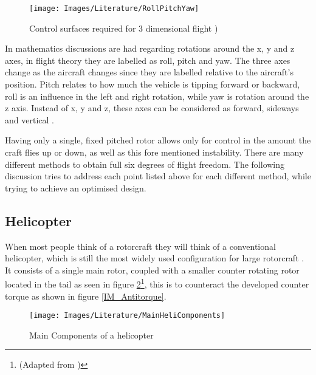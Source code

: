 \begin{figure}[H]
	\centering
	\texttt{[image: Images/Literature/RollPitchYaw]}     
	\caption{Control surfaces required for 3 dimensional flight \cite{Heli})}
	\label{IM_PRY}
\end{figure}

In mathematics discussions are had regarding rotations around the x, y and z axes, in flight theory they are labelled as roll, pitch and yaw. The three axes change as the aircraft changes since they are labelled relative to the aircraft's position. Pitch relates to how much the vehicle is tipping forward or backward, roll is an influence in the left and right rotation, while yaw is rotation around the z axis. Instead of  x, y and z, these axes can be considered as forward, sideways and vertical \cite{Leishman}.

Having only a single, fixed pitched rotor allows only for control in the amount the craft flies up or down, as well as this fore mentioned instability. There are many different methods to obtain full six degrees of flight freedom. The following discussion tries to address each point listed above for each different method, while trying to achieve an optimised design.


	\subsection{Helicopter}
	When most people think of a rotorcraft they will think of a conventional helicopter, which is still the most widely used configuration for large rotorcraft \cite{RotorConfig}. It consists of a single main rotor, coupled with a smaller counter rotating rotor located in the tail as seen in figure \ref{IM_Helicopter}\footnote{(Adapted from \cite{Heli})}, this is to counteract the developed counter torque as shown in figure \ref{IM_Antitorque}.
	
	\begin{figure}[H]
	\centering
	\texttt{[image: Images/Literature/MainHeliComponents]}     
	\caption{Main Components of a helicopter \cite{Heli}}
	\label{IM_Helicopter}
	\end{figure}
	
